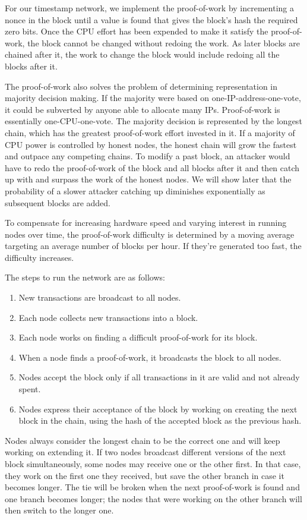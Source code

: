 \documentclass{article}
\begin{document}
For our timestamp network, we implement the proof-of-work by incrementing a nonce in the block until a value is found that gives the block's hash the required zero bits. Once the CPU effort has been expended to make it satisfy the proof-of-work, the block cannot be changed without redoing the work. As later blocks are chained after it, the work to change the block would include redoing all the blocks after it.

The proof-of-work also solves the problem of determining representation in majority decision making. If the majority were based on one-IP-address-one-vote, it could be subverted by anyone able to allocate many IPs. Proof-of-work is essentially one-CPU-one-vote. The majority decision is represented by the longest chain, which has the greatest proof-of-work effort invested in it. If a majority of CPU power is controlled by honest nodes, the honest chain will grow the fastest and outpace any competing chains. To modify a past block, an attacker would have to redo the proof-of-work of the block and all blocks after it and then catch up with and surpass the work of the honest nodes. We will show later that the probability of a slower attacker catching up diminishes exponentially as subsequent blocks are added.

To compensate for increasing hardware speed and varying interest in running nodes over time, the proof-of-work difficulty is determined by a moving average targeting an average number of blocks per hour. If they're generated too fast, the difficulty increases.

The steps to run the network are as follows:
\begin{enumerate}
\item New transactions are broadcast to all nodes.
\item Each node collects new transactions into a block.
\item Each node works on finding a difficult proof-of-work for its block.
\item When a node finds a proof-of-work, it broadcasts the block to all nodes.
\item Nodes accept the block only if all transactions in it are valid and not already spent.
\item Nodes express their acceptance of the block by working on creating the next block in the chain, using the hash of the accepted block as the previous hash.
\end{enumerate}

Nodes always consider the longest chain to be the correct one and will keep working on extending it. If two nodes broadcast different versions of the next block simultaneously, some nodes may receive one or the other first. In that case, they work on the first one they received, but save the other branch in case it becomes longer. The tie will be broken when the next proof-of-work is found and one branch becomes longer; the nodes that were working on the other branch will then switch to the longer one.
\end{document}
